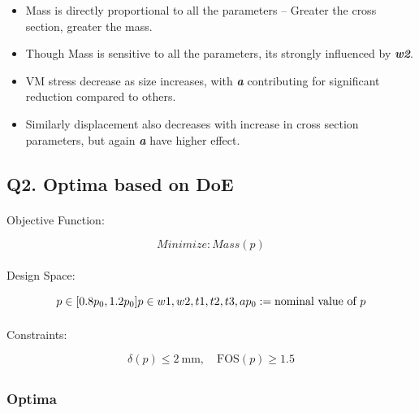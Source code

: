 \documentclass[
  letterpaper,
  DIV=11,
  numbers=noendperiod]{scrartcl}
\makeatletter
\let\oldparagraph\paragraph
\renewcommand{\paragraph}{
    \@ifstar
      \xxxParagraphStar
      \xxxParagraphNoStar
  }
\newcommand{\xxxParagraphStar}[1]{\oldparagraph*{#1}\mbox{}}
\newcommand{\xxxParagraphNoStar}[1]{\oldparagraph{#1}\mbox{}}
\providecommand{\tightlist}{%
  \setlength{\itemsep}{0pt}\setlength{\parskip}{0pt}}
\makeatother
\begin{document}
\begin{itemize}
\tightlist
\item
  Mass is directly proportional to all the parameters -- Greater the
  cross section, greater the mass.
\item
  Though Mass is sensitive to all the parameters, its strongly
  influenced by \textbf{\emph{w2}}.
\item
  VM stress decrease as size increases, with \textbf{\emph{a}}
  contributing for significant reduction compared to others.
\item
  Similarly displacement also decreases with increase in cross section
  parameters, but again \textbf{\emph{a}} have higher effect.
\end{itemize}

\subsection{Q2. Optima based on DoE}\label{q2.-optima-based-on-doe}

\paragraph{Objective Function:}\label{objective-function}

\[
Minimize: Mass(p)
\]

\paragraph{Design Space:}\label{design-space}

\[
p \in [0.8 p_0, 1.2 p_0]\\
p \in {w1,w2,t1,t2,t3,a}\\
p_0 := \text{nominal value of }p
\]

\paragraph{Constraints:}\label{constraints}

\[
\delta(p) \le 2~\text{mm}, \quad \text{FOS}(p) \ge 1.5
\]

\subsection{}\label{section-1}

\subsubsection{Optima}\label{optima}
\end{document}
